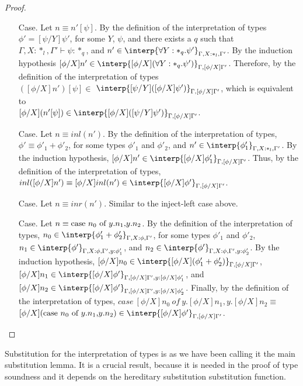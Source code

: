 \begin{proof}
\begin{itemize}
\item[Case.]  Let $n \equiv n'[\psi]$.  By the definition of the
  interpretation of types $\phi' = [\psi/Y]\psi'$, for some $Y$, $\psi$, and 
  there exists a $q$ such that $\Gamma,X:*_l,\Gamma' \vdash \psi:*_q$, and 
  $n' \in \interp{\forall Y:*_q.\psi'}_{\Gamma,X:*_l,\Gamma'}$.  By the 
  induction hypothesis 
  $[\phi/X]n' \in \interp{[\phi/X](\forall Y:*_q.\psi')}_{\Gamma,[\phi/X]\Gamma'}$.
  Therefore, by the definition of the interpretation of types\\
  $([\phi/X]n')[\psi] \in$
  $ \interp{[\psi/Y]([\phi/X]\psi')}_{\Gamma,[\phi/X]\Gamma'}$, which is equivalent
  to \\
  $[\phi/X](n'[\psi]) \in \interp{[\phi/X]([\psi/Y]\psi')}_{\Gamma,[\phi/X]\Gamma'}$.
  
\item[Case.] Let $n \equiv inl(n')$.  By the definition of the interpretation of types,
  $\phi' \equiv \phi'_1 + \phi'_2$, for some types $\phi'_1$ and $\phi'_2$, and 
  $n' \in \interp{\phi'_1}_{\Gamma,X:*_l,\Gamma'}$.  By the induction hypothesis,
  $[\phi/X]n' \in \interp{[\phi/X]\phi'_1}_{\Gamma,[\phi/X]\Gamma'}$.  Thus, by the definition of
  the interpretation of types, 
  $inl([\phi/X]n') \equiv [\phi/X]inl(n') \in \interp{[\phi/X]\phi'}_{\Gamma,[\phi/X]\Gamma'}$.
  
\item[Case.] Let $n \equiv inr(n')$.  Similar to the inject-left case above.
  
\item[Case.] Let $n \equiv \mbox{case}\ n_0\ \text{of}\ y\text{.}n_1\text{,}y\text{.}n_2$.  By the definition of the 
  interpretation of types,
  $n_0 \in \interp{\phi'_1 + \phi'_2}_{\Gamma,X:\phi,\Gamma'}$, for some types $\phi'_1$ and 
  $\phi'_2$,
  $n_1 \in \interp{\phi'}_{\Gamma,X:\phi,\Gamma',y:\phi'_1}$, and 
  $n_2 \in \interp{\phi'}_{\Gamma,X:\phi,\Gamma',y:\phi'_2}$.
  By the induction hypothesis, 
  $[\phi/X]n_0 \in \interp{[\phi/X](\phi'_1 + \phi'_2)}_{\Gamma,[\phi/X]\Gamma'}$,
  $[\phi/X]n_1 \in \interp{[\phi/X]\phi'}_{\Gamma,[\phi/X]\Gamma',y:[\phi/X]\phi'_1}$, and\\ 
  $[\phi/X]n_2 \in \interp{[\phi/X]\phi'}_{\Gamma,[\phi/X]\Gamma',y:[\phi/X]\phi'_2}$.  Finally, by 
  the definition of the interpretation
  of types, 
  $case\ [\phi/X]n_0\ of\ y.[\phi/X]n_1,y.[\phi/X]n_2 \equiv$\\
  $[\phi/X](\ccon{n_0}{y}{n_1}{n_2}) 
  \in \interp{[\phi/X]\phi'}_{\Gamma,[\phi/X]\Gamma'}$.
\end{itemize}
\end{proof}
Substitution for the interpretation of types is as we have been
calling it the main substitution lemma.  It is a crucial result,
because it is needed in the proof of type soundness and it depends on
the hereditary substitution substitution function.

